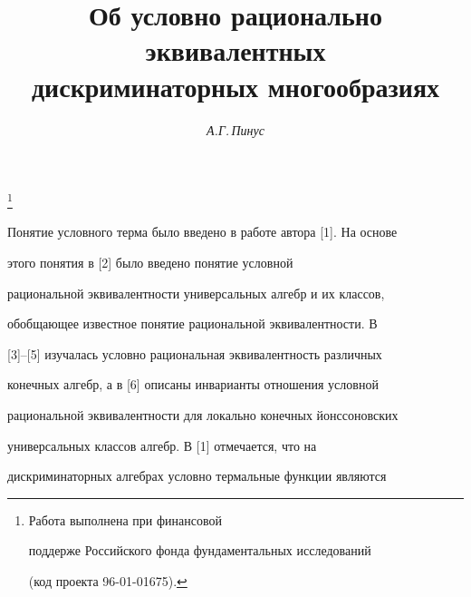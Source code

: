 








\author{\it А.Г.\,Пинус}




\title{Об условно рационально эквивалентных\\


дискриминаторных многообразиях}


\thanks{Работа выполнена при финансовой 


поддерже Российского фонда фундаментальных исследований 


(код проекта 96-01-01675).}





\date{}




\pagestyle{plain} %







\maketitle


\label{begin}





Понятие условного терма было введено в работе автора [1]. На основе


этого понятия в [2] было введено понятие условной


рациональной эквивалентности универсальных алгебр и их классов,


обобщающее известное понятие рациональной эквивалентности. В


[3]--[5] изучалась условно рациональная эквивалентность различных


конечных алгебр, а в [6] описаны инварианты отношения условной


рациональной эквивалентности для локально конечных йонссоновских


универсальных классов алгебр. В [1] отмечается, что на


дискриминаторных алгебрах условно термальные функции являются


